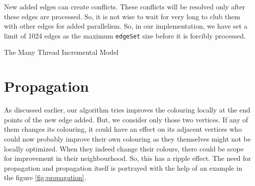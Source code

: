 \documentclass[MTech]{iitmdiss}
\makeatletter
\def\BState{\State\hskip-\ALG@thistlm}
\makeatother
\begin{document}
New added edges can create conflicts. These conflicts will be resolved only after these edges are processed. So, it is not wise to wait for very long to club them with other edges for added parallelism. So, in our implementation, we have set a limit of 1024 edges as the maximum \verb+edgeSet+ size before it is forcibly processed.

\begin{algorithm}
\caption{The Many Thread Incremental Model}\label{manythread}
\end{algorithm}

\section{Propagation}
As discussed earlier, our algorithm tries improves the colouring locally at the end points of the new edge added. But, we consider only those two vertices. If any of them changes its colouring, it could have an effect on its adjacent vertices who could now probably improve their own colouring as they themselves might not be locally optimized. When they indeed change their colours, there could be scope for improvement in their neighbourhood. So, this has a ripple effect. The need for propagation and propagation itself is portrayed with the help of an example in the figure \ref{fig:propagation}.
\end{document}

